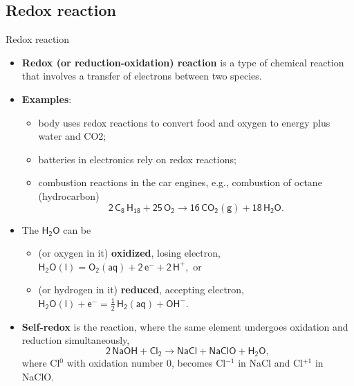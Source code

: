 \subsection{Redox reaction}
%	
%
\begin{frame}{Redox reaction}
	\small
	\begin{itemize}
		\item \alert{\textbf{Redox (or reduction-oxidation) reaction}} is a type of chemical reaction that involves a transfer 
		of electrons between two species.
		\pause
		\item { \bf Examples}: 
		\begin{itemize}
				\item body uses redox reactions to convert food and oxygen to energy plus water and CO2;
				\item batteries in electronics rely on redox reactions;
				\item combustion reactions in the car engines, e.g., combustion of octane (hydrocarbon)
				\[
				\mathsf{2 \, C_8\, H_{18} + 25\,O_2 \rightarrow 16\, CO_2(g) + 18\,H_2O}.
				\]			
		\end{itemize}
		\pause
		\item The $\mathsf{H_2O}$ can be 
		\begin{itemize}
			\item (or oxygen in it) \alert{\bf oxidized}, losing electron, 
			$\mathsf{H_2O(l) = O_2(aq) + 2\, e^{-} + 2\, H^+,}$ or 
			
			\item (or hydrogen in it) \alert{\bf reduced}, accepting electron, 
			$
			\mathsf{H_2O(l) + e^{-} = \tfrac{1}{2} \, H_2(aq) + OH^-.}$
		\end{itemize}
		\pause
		\item \alert{\bf Self-redox} is the reaction, where the same element undergoes oxidation and reduction simultaneously,  
		\[
		\mathsf{2\, NaOH + Cl_2 \rightarrow NaCl + NaClO + H_2O,}
		\]
		where Cl$^0$ with oxidation number 0, becomes Cl$^{-1}$  in NaCl and Cl$^{+1}$  in NaClO. 
	\end{itemize}
\end{frame}
